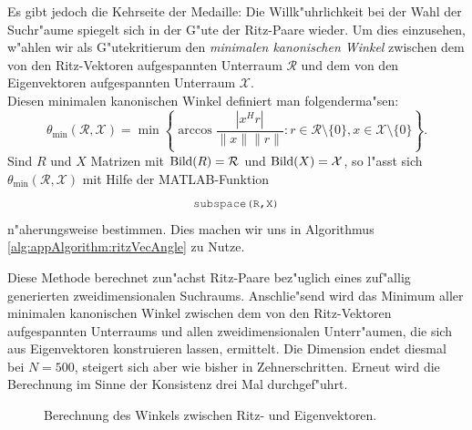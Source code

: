 Es gibt jedoch die Kehrseite der Medaille: Die Willk"uhrlichkeit bei der Wahl der Suchr"aume spiegelt sich in der G"ute der Ritz-Paare wieder. Um dies einzusehen, w"ahlen wir als G"utekritierum den \emph{minimalen kanonischen Winkel} zwischen dem von den Ritz-Vektoren aufgespannten Unterraum $\mathcal{R}$ und dem von den Eigenvektoren aufgespannten Unterraum $\mathcal{X}$.\\

Diesen minimalen kanonischen Winkel definiert man folgenderma"sen:
\[
\theta_{\min}(\mathcal{R},\mathcal{X}) =
\min
\left\{\arccos\frac{|x^H r|}{\|x\|\|r\|} : r\in\mathcal{R}\setminus\{0\}, x\in\mathcal{X}\setminus\{0\}\right\}.
\]
Sind $R$ und $X$ Matrizen mit $\operatorname{Bild}(R)=\mathcal{R}$ und $\operatorname{Bild}(X)=\mathcal{X}$, so l"asst sich $\theta_{\min}(\mathcal{R},\mathcal{X})$ mit Hilfe der MATLAB-Funktion
\[
\mcode{subspace(R,X)}
\]
n"aherungsweise bestimmen. Dies machen wir uns in Algorithmus \ref{alg:appAlgorithm:ritzVecAngle} zu Nutze.

\newpage

Diese Methode berechnet zun"achst Ritz-Paare bez"uglich eines zuf"allig generierten zweidimensionalen Suchraums. Anschlie"send wird das Minimum aller minimalen kanonischen Winkel zwischen dem von den Ritz-Vektoren aufgespannten Unterraums und allen zweidimensionalen Unterr"aumen, die sich aus Eigenvektoren konstruieren lassen, ermittelt. Die Dimension endet diesmal bei $N=500$, steigert sich aber wie bisher in Zehnerschritten. Erneut wird die Berechnung im Sinne der Konsistenz drei Mal durchgef"uhrt.

\begin{figure}[h!]
\centering


\caption{Berechnung des Winkels zwischen Ritz- und Eigenvektoren.}\label{fig:chap5:winkel}
\end{figure}

